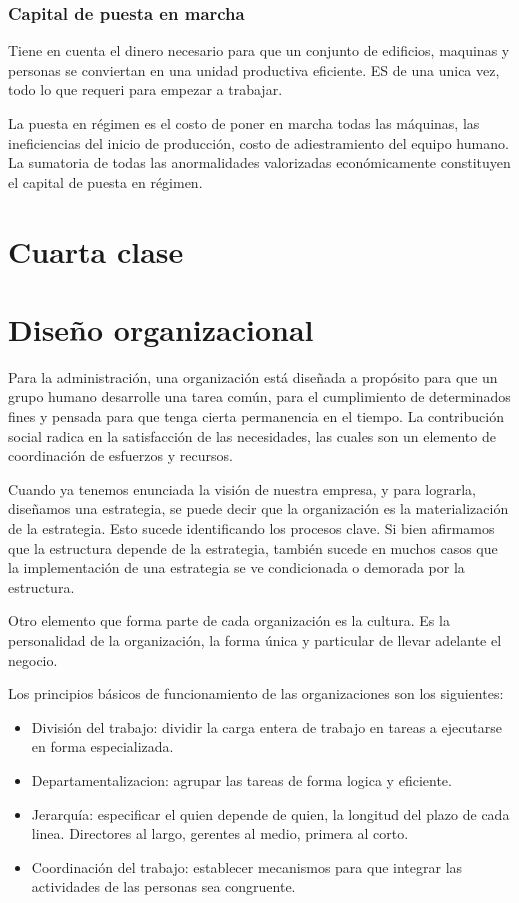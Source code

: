 \documentclass[titlepage,a4paper]{article}
\begin{document}
\subsubsection*{Capital de puesta en marcha}
Tiene en cuenta el dinero necesario para que un conjunto de edificios, maquinas y personas se conviertan en una unidad productiva eficiente. ES de una unica vez, todo lo que requeri para empezar a trabajar.

La puesta en régimen es el costo de poner en marcha todas las máquinas, las ineficiencias del inicio de producción, costo de adiestramiento del equipo humano. La sumatoria de todas las anormalidades valorizadas económicamente constituyen el capital de puesta en régimen.

\newpage
\section*{Cuarta clase}

\section{Diseño organizacional}

Para la administración, una organización está diseñada a propósito para que un grupo humano desarrolle una tarea común, para el cumplimiento de determinados fines y pensada para que tenga cierta permanencia en el tiempo. La contribución social radica en la satisfacción de las necesidades, las cuales son un elemento de coordinación de esfuerzos y recursos.

Cuando ya tenemos enunciada la visión de nuestra empresa, y para lograrla, diseñamos una estrategia, se puede decir que la organización es la materialización de la estrategia. Esto sucede identificando los procesos clave. Si bien afirmamos que la estructura depende de la estrategia, también sucede en muchos casos que la implementación de una estrategia se ve condicionada o demorada por la estructura. 

Otro elemento que forma parte de cada organización es la cultura. Es la personalidad de la organización, la forma única y particular de llevar adelante el negocio.

Los principios básicos de funcionamiento de las organizaciones son los siguientes:
\begin{itemize}
    \item División del trabajo: dividir la carga entera de trabajo en tareas a ejecutarse en forma especializada.
    \item Departamentalizacion: agrupar las tareas de forma logica y eficiente.
    \item Jerarquía: especificar el quien depende de quien, la longitud del plazo de cada linea. Directores al largo, gerentes al medio, primera al corto.
    \item Coordinación del trabajo: establecer mecanismos para que integrar las actividades de las personas sea congruente. 
\end{itemize}
\end{document}

